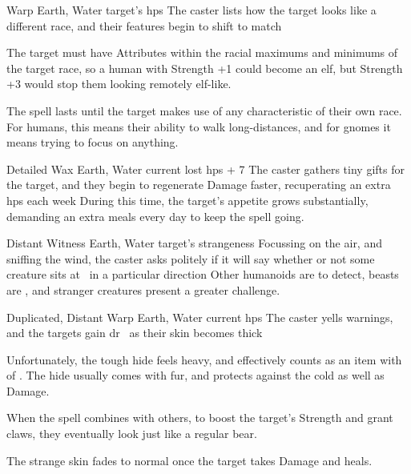 \begin{multicols}{2}
{  %
    {}%
    {Warp}%
    {Earth, Water}%
    {target's \glspl{hp}}%
    {The caster lists how the target looks like a different race, and their features begin to shift to match}%
    {The target must have Attributes within the racial maximums and minimums of the target race, so a human with Strength +1 could become an elf, but Strength +3 would stop them looking remotely elf-like.

    The spell lasts until the target makes use of any characteristic of their own race.
    For humans, this means their ability to walk long-distances, and for gnomes it means trying to focus on anything.}

    {Detailed}%
    {Wax}%
    {Earth, Water}%
    {current lost \glspl{hp} + 7}%
    {The caster gathers tiny gifts for the target, and they begin to regenerate Damage faster, recuperating an extra  \glspl{hp} each week}%
    {During this time, the target's appetite grows substantially, demanding an extra  meals every day to keep the spell going.}


    {Distant}%
    {Witness}%
    {Earth, Water}%
    {target's strangeness}%
    {Focussing on the air, and sniffing the wind, the caster asks politely if it will say whether or not some creature sits at \spellRange\ in a particular direction}%
    {Other humanoids are \tn[7] to detect, beasts are \tn[9], and stranger creatures present a greater challenge.}


    {Duplicated, Distant}%
    {Warp}%
    {Earth, Water}%
    {current \glspl{hp}}%
    {The caster yells warnings, and the targets gain \gls{dr}~ as their skin becomes thick}%
    {Unfortunately, the tough hide feels heavy, and effectively counts as an item with  of .
    The hide usually comes with fur, and protects against the cold as well as Damage.

    When the spell combines with others, to boost the target's Strength and grant claws, they eventually look just like a regular bear.

    The strange skin fades to normal once the target takes Damage and heals.}

}
\end{multicols}
